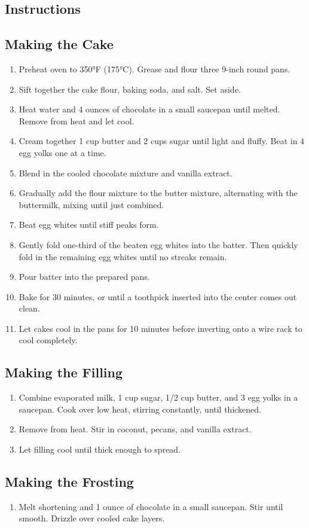 \documentclass[10pt]{article}
\begin{document}
\begin{paracol}{2}
\section*{Instructions}
\subsection*{Making the Cake}
\begin{enumerate}[leftmargin=*]
\item Preheat oven to 350°F (175°C). Grease and flour three 9-inch round pans.
\item Sift together the cake flour, baking soda, and salt. Set aside.
\item Heat water and 4 ounces of chocolate in a small saucepan until melted. Remove from heat and let cool.
\item Cream together 1 cup butter and 2 cups sugar until light and fluffy. Beat in 4 egg yolks one at a time.
\item Blend in the cooled chocolate mixture and vanilla extract.
\item Gradually add the flour mixture to the butter mixture, alternating with the buttermilk, mixing until just combined.
\item Beat egg whites until stiff peaks form.
\item Gently fold one-third of the beaten egg whites into the batter. Then quickly fold in the remaining egg whites until no streaks remain.
\item Pour batter into the prepared pans.
\item Bake for 30 minutes, or until a toothpick inserted into the center comes out clean.
\item Let cakes cool in the pans for 10 minutes before inverting onto a wire rack to cool completely.
\end{enumerate}
\subsection*{Making the Filling}
\begin{enumerate}[leftmargin=*]
\item Combine evaporated milk, 1 cup sugar, 1/2 cup butter, and 3 egg yolks in a saucepan. Cook over low heat, stirring constantly, until thickened.
\item Remove from heat. Stir in coconut, pecans, and vanilla extract.
\item Let filling cool until thick enough to spread.
\end{enumerate}
\subsection*{Making the Frosting}
\begin{enumerate}[leftmargin=*]
\item Melt shortening and 1 ounce of chocolate in a small saucepan. Stir until smooth. Drizzle over cooled cake layers.
\end{enumerate}
\end{paracol}
\end{document}
